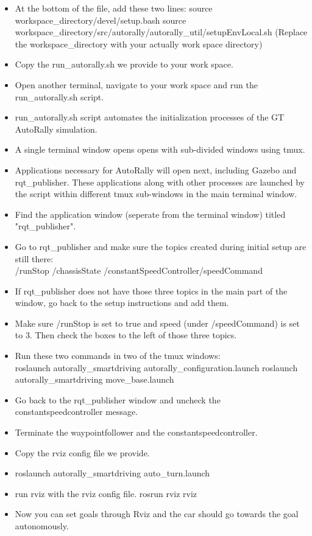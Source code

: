 \documentclass[compsoc,draftclsnofoot,onecolumn,10pt]{IEEEtran}
\begin{document}
\begin{itemize}
    	\item At the bottom of the file, add these two lines: source workspace\_directory/devel/setup.bash source workspace\_directory/src/autorally/autorally\_util/setupEnvLocal.sh (Replace the workspace\_directory with your actually work space directory)
    	\item Copy the run\_autorally.sh we provide to your work space.
    	\item Open another terminal, navigate to your work space and run the run\_autorally.sh script.
    	\item run\_autorally.sh script automates the initialization processes of the GT AutoRally simulation.
    	\item A single terminal window opens opens with sub-divided windows using tmux.
    	\item Applications necessary for AutoRally will open next, including Gazebo and rqt\_publisher. These applications along with other processes are launched by the script within different tmux sub-windows in the main terminal window.
    	\item Find the application window (seperate from the terminal window) titled "rqt\_publisher".
    	\item Go to rqt\_publisher and make sure the topics created during initial setup are still there:\\ /runStop /chassisState /constantSpeedController/speedCommand
    	\item If rqt\_publisher does not have those three topics in the main part of the window, go back to the setup instructions and add them.
    	\item Make sure /runStop is set to true and speed (under /speedCommand) is set to 3. Then check the boxes to the left of those three topics.
    	\item Run these two commands in two of the tmux windows:\\ roslaunch autorally\_smartdriving autorally\_configuration.launch roslaunch autorally\_smartdriving move\_base.launch
    	\item Go back to the rqt\_publisher window and uncheck the constantspeedcontroller message.
    	\item Terminate the waypointfollower and the constantspeedcontroller.
    	\item Copy the rviz config file we provide.
    	\item roslaunch autorally\_smartdriving auto\_turn.launch
    	\item run rviz with the rviz config file. rosrun rviz rviz
    	\item Now you can set goals through Rviz and the car should go towards the goal autonomously.
    \end{itemize}
\end{document}
